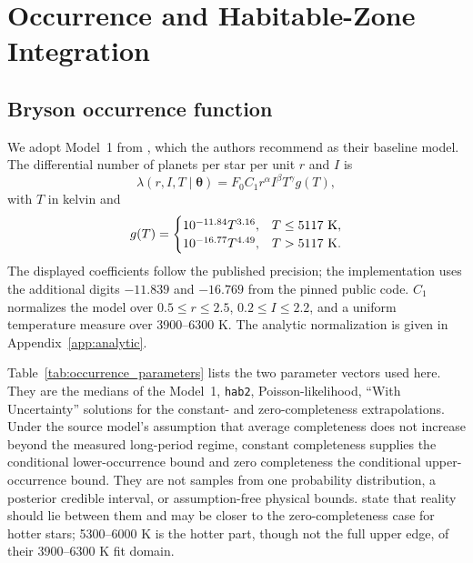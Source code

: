 \section{Occurrence and Habitable-Zone Integration}\label{sec:occurrence}

\subsection{Bryson occurrence function}

We adopt Model~1 from \citet{Bryson2021}, which the authors recommend as their baseline model. The differential number of planets per star per unit $r$ and $I$ is
\begin{equation}
 \lambda(r,I,T\mid\bm\theta)
 =F_0C_1r^\alpha I^\beta T^\gamma g(T),
 \label{eq:lambda}
\end{equation}
with $T$ in kelvin and
\begin{equation}
 g(T)=
 \begin{cases}
 10^{-11.84}T^{3.16}, & T\leq5117\ {\rm K},\\
 10^{-16.77}T^{4.49}, & T>5117\ {\rm K}.
 \end{cases}
 \label{eq:gT}
\end{equation}
The displayed coefficients follow the published precision; the implementation uses the additional digits $-11.839$ and $-16.769$ from the pinned public code. $C_1$ normalizes the model over $0.5\leq r\leq2.5$, $0.2\leq I\leq2.2$, and a uniform temperature measure over 3900--6300 K. The analytic normalization is given in Appendix~\ref{app:analytic}.

Table~\ref{tab:occurrence_parameters} lists the two parameter vectors used here. They are the medians of the \citet{Bryson2021} Model~1, \texttt{hab2}, Poisson-likelihood, ``With Uncertainty'' solutions for the constant- and zero-completeness extrapolations. Under the source model's assumption that average completeness does not increase beyond the measured long-period regime, constant completeness supplies the conditional lower-occurrence bound and zero completeness the conditional upper-occurrence bound. They are not samples from one probability distribution, a posterior credible interval, or assumption-free physical bounds. \citet{Bryson2021} state that reality should lie between them and may be closer to the zero-completeness case for hotter stars; 5300--6000 K is the hotter part, though not the full upper edge, of their 3900--6300 K fit domain.

